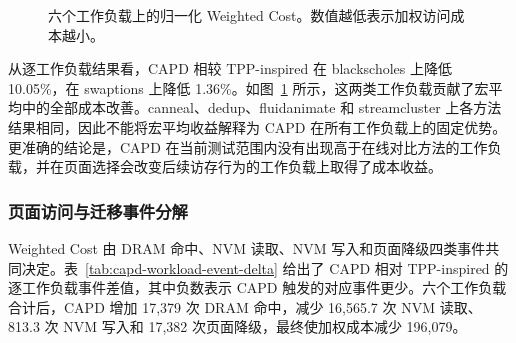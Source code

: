 \begin{figure}[htbp]
  \centering
  \caption{六个工作负载上的归一化 Weighted Cost。数值越低表示加权访问成本越小。}
  \label{fig:capd-workload-cost}
\end{figure}

从逐工作负载结果看，CAPD 相较 TPP-inspired 在 blackscholes 上降低 10.05\%，在 swaptions 上降低 1.36\%。如图~\ref{fig:capd-workload-cost} 所示，这两类工作负载贡献了宏平均中的全部成本改善。canneal、dedup、fluidanimate 和 streamcluster 上各方法结果相同，因此不能将宏平均收益解释为 CAPD 在所有工作负载上的固定优势。更准确的结论是，CAPD 在当前测试范围内没有出现高于在线对比方法的工作负载，并在页面选择会改变后续访存行为的工作负载上取得了成本收益。

\subsubsection{\heiti 页面访问与迁移事件分解}

Weighted Cost 由 DRAM 命中、NVM 读取、NVM 写入和页面降级四类事件共同决定。表~\ref{tab:capd-workload-event-delta} 给出了 CAPD 相对 TPP-inspired 的逐工作负载事件差值，其中负数表示 CAPD 触发的对应事件更少。六个工作负载合计后，CAPD 增加 17,379 次 DRAM 命中，减少 16,565.7 次 NVM 读取、813.3 次 NVM 写入和 17,382 次页面降级，最终使加权成本减少 196,079。

